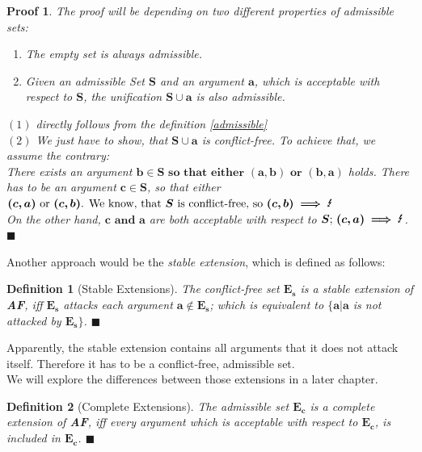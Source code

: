 \documentclass[12pt]{report}
\numberwithin{figure}{chapter}
\theoremstyle{break}
\newtheorem{defn}{Definition}[chapter]
\newtheorem*{prf}{Proof}
\newenvironment{mydefn}{\begin{defn}}{$\blacksquare$ \end{defn}}
\newenvironment{myprf}{\begin{prf}}{$\blacksquare$ \end{prf}}
\begin{document}
\begin{myprf}
The proof will be depending on two different properties of admissible sets:
\begin{enumerate}
	\item{The empty set is always admissible.}
	\item{Given an admissible Set $\bm{S}$ and an argument $\bm{a}$, which is acceptable with respect to $\bm{S}$, the unification $\bm{S \cup a}$ is also admissible.}
\end{enumerate}
$(1)$ directly follows from the definition \ref{admissible}\\
$(2)$ We just have to show, that $\bm{S \cup a}$ is conflict-free. To achieve that, we assume the contrary:\\ 
There exists an argument $\bm{b \in S \text{ so that either } (a,b) \text{ or } (b,a)}$ holds.
There has to be an argument $\bm{c \in S}$, so that either $\bm{(c,a) \text{ or } (c,b) \text{. We know, that } S \text{ is conflict-free, so } (c,b) \implies \text{\Lightning}}$\\
On the other hand, $\bm{c \text{ and } a}$ are both acceptable with respect to $\bm{S \text{; } (c,a) \implies \text{\Lightning}}$.  
\end{myprf}

Another approach would be the \textit{stable extension}, which is defined as follows:

\begin{mydefn}[Stable Extensions]
The conflict-free set $\bm{E_{s}}$ is a stable extension of \textbf{AF}, iff $\bm{E_{s}}$ attacks each argument $\bm{a \notin E_{s}}$; which is equivalent to
$\bm{\{a \vert a}$ is not attacked by $\bm{E_{s}\}}$.
\end{mydefn}

Apparently, the stable extension contains all arguments that it does not attack itself. Therefore it has to be a conflict-free, admissible set.\\
We will explore the differences between those extensions in a later chapter. 

\newpage

\begin{mydefn}[Complete Extensions]
The admissible set $\bm{E_{c}}$ is a complete extension of \textbf{AF}, iff every argument which is acceptable with respect to $\bm{E_{c}}$, is included in $\bm{E_{c}}$.
\end{mydefn}
\end{document}
